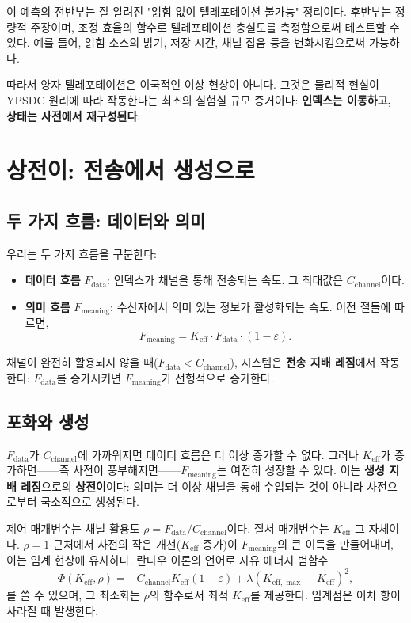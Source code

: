 \documentclass[12pt,a4paper]{article}
\newcommand{\Keff}{K_{\mathrm{eff}}}
\newcommand{\Keffmax}{K_{\mathrm{eff},\max}}
\begin{document}
	이 예측의 전반부는 잘 알려진 "얽힘 없이 텔레포테이션 불가능" 정리이다. 후반부는 정량적 주장이며, 조정 효율의 함수로 텔레포테이션 충실도를 측정함으로써 테스트할 수 있다. 예를 들어, 얽힘 소스의 밝기, 저장 시간, 채널 잡음 등을 변화시킴으로써 가능하다.
	
	따라서 양자 텔레포테이션은 이국적인 이상 현상이 아니다. 그것은 물리적 현실이 YPSDC 원리에 따라 작동한다는 최초의 실험실 규모 증거이다: \textbf{인덱스는 이동하고, 상태는 사전에서 재구성된다}.
	
	\section{상전이: 전송에서 생성으로}
	\label{sec:transition}
	
	\subsection{두 가지 흐름: 데이터와 의미}
	
	우리는 두 가지 흐름을 구분한다:
	\begin{itemize}
		\item \textbf{데이터 흐름} $F_{\text{data}}$: 인덱스가 채널을 통해 전송되는 속도. 그 최대값은 $C_{\text{channel}}$이다.
		\item \textbf{의미 흐름} $F_{\text{meaning}}$: 수신자에서 의미 있는 정보가 활성화되는 속도. 이전 절들에 따르면,
		\[
		F_{\text{meaning}} = \Keff \cdot F_{\text{data}} \cdot (1 - \varepsilon).
		\]
	\end{itemize}
	
	채널이 완전히 활용되지 않을 때($F_{\text{data}} < C_{\text{channel}}$), 시스템은 \textbf{전송 지배 레짐}에서 작동한다: $F_{\text{data}}$를 증가시키면 $F_{\text{meaning}}$가 선형적으로 증가한다.
	
	\subsection{포화와 생성}
	
	$F_{\text{data}}$가 $C_{\text{channel}}$에 가까워지면 데이터 흐름은 더 이상 증가할 수 없다. 그러나 $\Keff$가 증가하면——즉 사전이 풍부해지면——$F_{\text{meaning}}$는 여전히 성장할 수 있다. 이는 \textbf{생성 지배 레짐}으로의 \textbf{상전이}이다: 의미는 더 이상 채널을 통해 수입되는 것이 아니라 사전으로부터 국소적으로 생성된다.
	
	제어 매개변수는 채널 활용도 $\rho = F_{\text{data}} / C_{\text{channel}}$이다. 질서 매개변수는 $\Keff$ 그 자체이다. $\rho = 1$ 근처에서 사전의 작은 개선($\Keff$ 증가)이 $F_{\text{meaning}}$의 큰 이득을 만들어내며, 이는 임계 현상에 유사하다. 란다우 이론의 언어로 자유 에너지 범함수
	\[
	\Phi(\Keff, \rho) = -C_{\text{channel}} \Keff (1 - \varepsilon) + \lambda (\Keffmax - \Keff)^2,
	\]
	를 쓸 수 있으며, 그 최소화는 $\rho$의 함수로서 최적 $\Keff$를 제공한다. 임계점은 이차 항이 사라질 때 발생한다.
	
\end{document}
